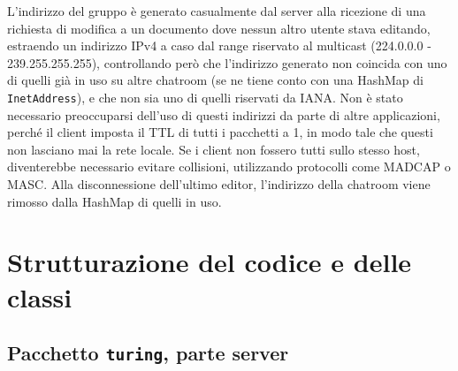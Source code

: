 \documentclass[a4paper,12pt]{article}
\begin{document}
 L'indirizzo del gruppo è generato casualmente dal server alla ricezione di una richiesta di modifica a un documento dove nessun altro utente stava editando, estraendo un indirizzo IPv4 a caso dal range riservato al multicast (224.0.0.0 - 239.255.255.255), controllando però che l'indirizzo generato non coincida con uno di quelli già in uso su altre chatroom (se ne tiene conto con una HashMap di \texttt{InetAddress}), e che non sia uno di quelli riservati da IANA. Non è stato necessario preoccuparsi dell'uso di questi indirizzi da parte di altre applicazioni, perché il client imposta il TTL di tutti i pacchetti a 1, in modo tale che questi non lasciano mai la rete locale. Se i client non fossero tutti sullo stesso host, diventerebbe necessario evitare collisioni, utilizzando protocolli come MADCAP o MASC. Alla disconnessione dell'ultimo editor, l'indirizzo della chatroom viene rimosso dalla HashMap di quelli in uso.
 
  \section{ Strutturazione del codice e delle classi }
 
 \subsection{ Pacchetto \texttt{turing}, parte server }
 
\end{document}
